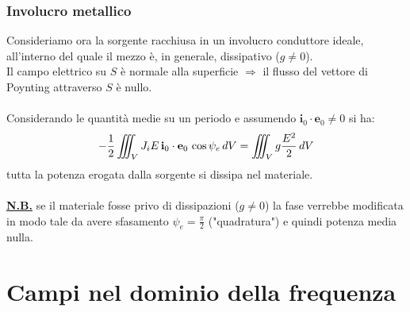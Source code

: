 \documentclass[a4paper]{article}
\begin{document}
\subsubsection*{Involucro metallico}
Consideriamo ora la sorgente racchiusa in un involucro conduttore ideale, all'interno del quale il mezzo è, in generale, dissipativo ($g\neq0$).\\Il campo elettrico su $S$ è normale alla superficie $\Rightarrow$ il flusso del vettore di Poynting attraverso $S$ è nullo.\\\\
Considerando le quantità medie su un periodo e assumendo $\textbf{i}_0\cdot\textbf{e}_0\neq0$ si ha:
\begin{equation*}
-\frac{1}{2}\iiint_{V}J_iE\,\textbf{i}_0\cdot\textbf{e}_0\,\cos\psi_e\,dV=\iiint_{V}g\frac{E^2}{2}\,dV\\
\end{equation*}
tutta la potenza erogata dalla sorgente si dissipa nel materiale.\\\\
\underline{\textbf{N.B.}} se il materiale fosse privo di dissipazioni ($g\neq0$) la fase verrebbe modificata in modo tale da avere sfasamento $\psi_e = \frac{\pi}{2}$ ("quadratura") e quindi potenza media nulla.
\section{Campi nel dominio della frequenza}
\end{document}
